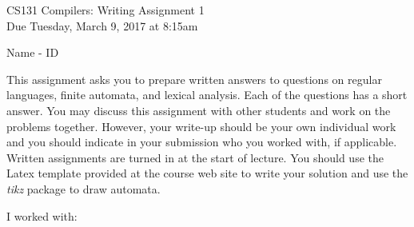\documentclass[10pt]{article}
\begin{document}
\begin{center}
\Large CS131 Compilers: Writing Assignment 1\\Due Tuesday, March 9, 2017 at 8:15am
\end{center}

\begin{center}
\LARGE Name - ID
\end{center}


This assignment asks you to prepare written answers to questions on
regular languages, finite automata, and lexical analysis.  Each of the
questions has a short answer.  You may discuss this assignment with
other students and work on the problems together.  However, your
write-up should be your own individual work and you should indicate in your submission who you worked
with, if applicable.  Written assignments are turned in at the start of lecture.
You should use the Latex template provided at the course web site to write your solution and use the \emph{tikz} package to draw
automata.

\begin{center}
I worked with:
\end{center}
\end{document}
